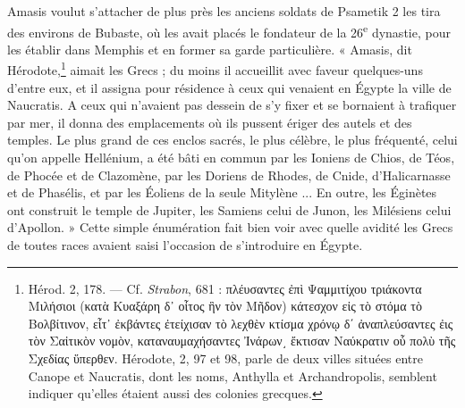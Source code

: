 \documentclass[letterpaper,twocolumn,openany,nodeprecatedcode]{dndbook}
\begin{document}
Amasis voulut s'attacher de plus près les anciens soldats de Psametik 2 les tira des environs de Bubaste, où les avait placés le fondateur de la 26\textsuperscript{e} dynastie, pour les établir dans Memphis et en former sa garde particulière. « Amasis, dit Hérodote,\footnote{Hérod. 2, 178. --- Cf. \emph{Strabon}, 681 : πλέυσαντες ἐπὶ Ψαμμιτίχου τριάκοντα Μιλήσιοι (κατὰ Κυαξάρη δ᾽ οἶτος ἣν τὸν Μῆδον) κάτεσχον εἰς τὸ στόμα τὸ Βολβίτινον, εἶτ᾽ ἐκβάντες ἐτείχισαν τὸ λεχθὲν κτίσμα χρόνῳ δ΄ ἀναπλεύσαντες ἐις τὸν Σαἰτικὸν νομὸν, καταναυμαχήσαντες Ἰνάρων͵ ἔκτισαν Ναύκρατιν οὗ πολὺ τῆς Σχεδίας ὕπερθεν. Hérodote, 2, 97 et 98, parle de deux villes situées entre Canope et Naucratis, dont les noms, Anthylla et Archandropolis, semblent indiquer qu'elles étaient aussi des colonies grecques.} aimait les Grecs ; du moins il accueillit avec faveur quelques-uns d'entre eux, et il assigna pour résidence à ceux qui venaient en Égypte la ville de Naucratis. A ceux qui n'avaient pas dessein de s'y fixer et se bornaient à trafiquer par mer, il donna des emplacements où ils pussent ériger des autels et des temples. Le plus grand de ces enclos sacrés, le plus célèbre, le plus fréquenté, celui qu'on appelle Hellénium, a été bâti en commun par les Ioniens de Chios, de Téos, de Phocée et de Clazomène, par les Doriens de Rhodes, de Cnide, d'Halicarnasse et de Phasélis, et par les Éoliens de la seule Mitylène ... En outre, les Éginètes ont construit le temple de Jupiter, les Samiens celui de Junon, les Milésiens celui d'Apollon. » Cette simple énumération fait bien voir avec quelle avidité les Grecs de toutes races avaient saisi l'occasion de s'introduire en Égypte.
\end{document}
